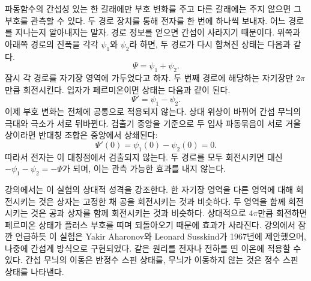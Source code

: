 파동함수의 간섭성 있는 한 갈래에만 부호 변화를 주고 다른 갈래에는 주지 않으면 그 부호를 관측할 수 있다. 두 경로 장치를 통해 전자를 한 번에 하나씩 보내자. 어느 경로를 지나는지 알아내지는 말자. 경로 정보를 얻으면 간섭이 사라지기 때문이다. 위쪽과 아래쪽 경로의 진폭을 각각 \(\psi_1\)와 \(\psi_2\)라 하면, 두 경로가 다시 합쳐진 상태는 다음과 같다.
\begin{equation}
\Psi=\psi_1+\psi_2.
\end{equation}
잠시 각 경로를 자기장 영역에 가두었다고 하자. 두 번째 경로에 해당하는 자기장만 \(2\pi\)만큼 회전시킨다. 입자가 페르미온이면 상태는 다음과 같이 된다.
\begin{equation}
\Psi'=\psi_1-\psi_2.
\end{equation}
이제 부호 변화는 전체에 공통으로 적용되지 않는다. 상대 위상이 바뀌어 간섭 무늬의 극대와 극소가 서로 뒤바뀐다. 검출기 중앙을 기준으로 두 입사 파동묶음이 서로 거울상이라면 반대칭 조합은 중앙에서 상쇄된다:
\begin{equation}
\Psi'(0)=\psi_1(0)-\psi_2(0)=0.
\end{equation}
따라서 전자는 이 대칭점에서 검출되지 않는다. 두 경로를 모두 회전시키면 대신 \(-\psi_1-\psi_2=-\Psi\)가 되며, 이는 관측 가능한 효과를 내지 않는다.

강의에서는 이 실험의 상대적 성격을 강조한다. 한 자기장 영역을 다른 영역에 대해 회전시키는 것은 상자는 고정한 채 공을 회전시키는 것과 비슷하다. 두 영역을 함께 회전시키는 것은 공과 상자를 함께 회전시키는 것과 비슷하다. 상대적으로 \(4\pi\)만큼 회전하면 페르미온 상태가 플러스 부호를 띠며 되돌아오기 때문에 효과가 사라진다. 강의에서 잠깐 언급하듯 이 실험은 Yakir Aharonov와 Leonard Susskind가 1967년에 제안했으며, 나중에 간섭계 방식으로 구현되었다. 같은 원리를 전자나 전하를 띤 이온에 적용할 수 있다. 간섭 무늬의 이동은 반정수 스핀 상태를, 무늬가 이동하지 않는 것은 정수 스핀 상태를 나타낸다.

\begin{classroomqa}\end{classroomqa}

\begin{classroomqa}\end{classroomqa}


